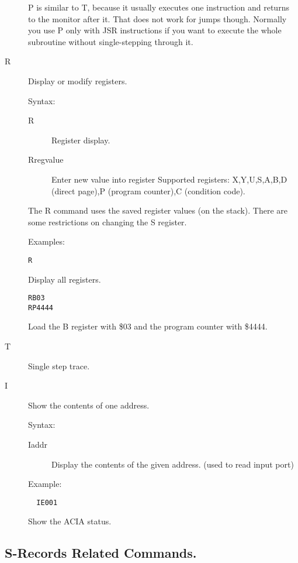 \begin{description}
P is similar to T, because it usually executes one instruction and returns
to the monitor after it. That does not work for jumps though. Normally you
use P only with JSR instructions if you want to execute the whole subroutine
without single-stepping through it. 

\item[R] Display or modify registers.

Syntax:
\begin{description}
\item[R]         Register display.  
\item[Rregvalue] Enter new value into register Supported registers:
          X,Y,U,S,A,B,D (direct page),P (program counter),C (condition code).
\end{description}
The R command uses the saved register values (on the stack). There are some
restrictions on changing the S register.

Examples:
\begin{verbatim}
R
\end{verbatim}
Display all registers.
\begin{verbatim}
RB03
RP4444
\end{verbatim}
Load the B register with \$03 and the program counter with \$4444.

\item[T] Single step trace. 

\item[I] Show the contents of one address.

Syntax:
\begin{description}
\item[Iaddr]      Display the contents of the given address. (used to read input 
           port)
\end{description}

Example:
\begin{verbatim}
  IE001
\end{verbatim}
Show the ACIA status.
\end{description}

\subsection{S-Records Related Commands.}

